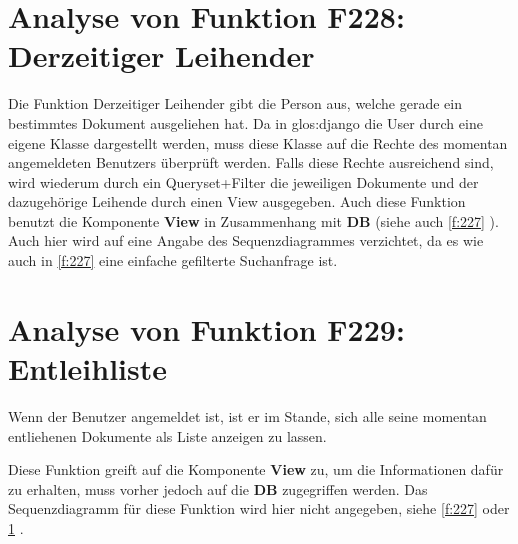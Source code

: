 \section{Analyse von Funktion F228: Derzeitiger Leihender}
\label{f:228}
Die Funktion Derzeitiger Leihender gibt die Person aus, welche gerade ein bestimmtes Dokument ausgeliehen hat.
Da in \gls{glos:django} die User durch eine eigene Klasse dargestellt werden, muss diese Klasse auf die Rechte des momentan angemeldeten Benutzers überprüft werden. Falls diese Rechte ausreichend sind, wird wiederum durch ein Queryset+Filter die jeweiligen Dokumente und der dazugehörige Leihende durch einen View ausgegeben.
Auch diese Funktion benutzt die Komponente \textbf{View} in Zusammenhang mit \textbf{DB} (siehe auch \ref{f:227} ).
Auch hier wird auf eine Angabe des Sequenzdiagrammes verzichtet, da es wie auch in \ref{f:227}  eine einfache gefilterte Suchanfrage ist.



\section{Analyse von Funktion F229: Entleihliste}
Wenn der Benutzer angemeldet ist, ist er im Stande, sich alle seine momentan entliehenen Dokumente als Liste anzeigen zu lassen.

Diese Funktion greift auf die Komponente \textbf{View} zu, um die Informationen dafür zu erhalten, muss vorher jedoch auf die \textbf{DB} zugegriffen werden.
Das Sequenzdiagramm für diese Funktion wird hier nicht angegeben, siehe \ref{f:227}  oder \ref{f:228} .
